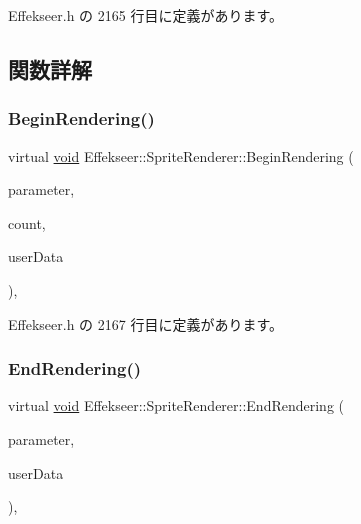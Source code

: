  Effekseer.\+h の 2165 行目に定義があります。



\subsection{関数詳解}
\mbox{\label{class_effekseer_1_1_sprite_renderer_a2ef6a8ea38ad412d813d1d02aec03070}} 
\subsubsection{\texorpdfstring{Begin\+Rendering()}{BeginRendering()}}
{\footnotesize\ttfamily virtual \mbox{\hyperlink{namespace_effekseer_ab34c4088e512200cf4c2716f168deb56}{void}} Effekseer\+::\+Sprite\+Renderer\+::\+Begin\+Rendering (\begin{DoxyParamCaption}\item[{const \mbox{\hyperlink{struct_effekseer_1_1_sprite_renderer_1_1_node_parameter}{Node\+Parameter}} \&}]{parameter,  }\item[{int32\+\_\+t}]{count,  }\item[{\mbox{\hyperlink{namespace_effekseer_ab34c4088e512200cf4c2716f168deb56}{void}} $\ast$}]{user\+Data }\end{DoxyParamCaption})\hspace{0.3cm}{\ttfamily [inline]}, {\ttfamily [virtual]}}



 Effekseer.\+h の 2167 行目に定義があります。

\mbox{\label{class_effekseer_1_1_sprite_renderer_a077dde1bafb304138dc929f607e8fb49}} 
\subsubsection{\texorpdfstring{End\+Rendering()}{EndRendering()}}
{\footnotesize\ttfamily virtual \mbox{\hyperlink{namespace_effekseer_ab34c4088e512200cf4c2716f168deb56}{void}} Effekseer\+::\+Sprite\+Renderer\+::\+End\+Rendering (\begin{DoxyParamCaption}\item[{const \mbox{\hyperlink{struct_effekseer_1_1_sprite_renderer_1_1_node_parameter}{Node\+Parameter}} \&}]{parameter,  }\item[{\mbox{\hyperlink{namespace_effekseer_ab34c4088e512200cf4c2716f168deb56}{void}} $\ast$}]{user\+Data }\end{DoxyParamCaption})\hspace{0.3cm}{\ttfamily [inline]}, {\ttfamily [virtual]}}



